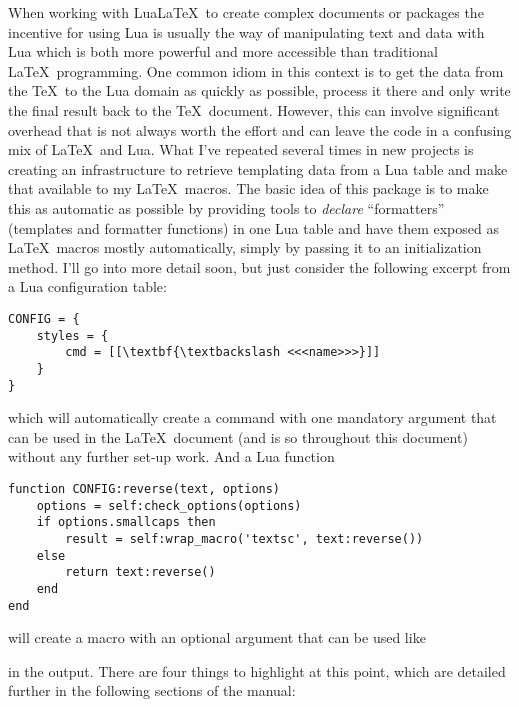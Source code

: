 \documentclass{scrartcl}
\begin{document}
When working with Lua\LaTeX\ to create complex documents or packages the
incentive for using Lua is usually the way of manipulating text and data with
Lua which is both more powerful and more accessible than traditional \LaTeX\
programming.  One common idiom in this context is to get the data from the \TeX\
to the Lua domain as quickly as possible, process it there and only write the
final result back to the \TeX\ document.  However, this can involve significant
overhead that is not always worth the effort and can leave the code in a
confusing mix of \LaTeX\ and Lua.  What I've repeated several times in new
projects is creating an infrastructure to retrieve templating data from a Lua
table and make that available to my \LaTeX\ macros.  The basic idea of this
package is to make this as automatic as possible by providing tools to
\emph{declare} “formatters” (templates and formatter functions) in one Lua table
and have them exposed as \LaTeX\ macros mostly automatically, simply by passing
it to an initialization method. I'll go into more detail soon, but just consider
the following excerpt from a Lua configuration table:

\begin{verbatim}
CONFIG = {
    styles = {
        cmd = [[\textbf{\textbackslash <<<name>>>}]]
    }
}
\end{verbatim}

\noindent which will automatically create a command 
with one mandatory argument that can be used in the \LaTeX\ document (and is so
throughout this document) without any further set-up work.  And a Lua function

\label{code:function}
\begin{verbatim}
function CONFIG:reverse(text, options)
    options = self:check_options(options)
    if options.smallcaps then
        result = self:wrap_macro('textsc', text:reverse())
    else
        return text:reverse()
    end
end
\end{verbatim}

\noindent will create a macro  with an optional
argument that can be used like

%
in the output.  There are four things
to highlight at this point, which are detailed further in the following sections
of the manual:
\end{document}
